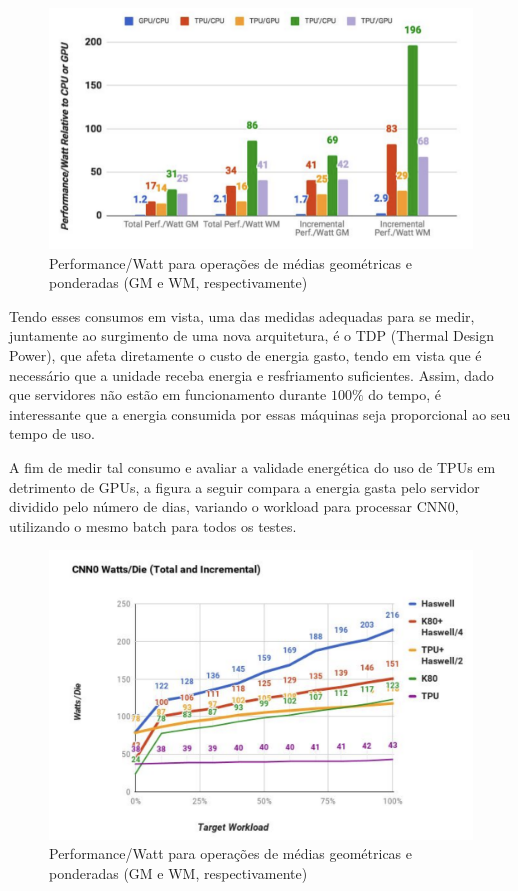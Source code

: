 \documentclass{report}
\begin{document}
\begin{figure}[h]
	\includegraphics[scale=0.5]{performance-watt}
	\centering
	\caption{Performance/Watt para operações de médias geométricas e ponderadas (GM e WM, respectivamente)}
\end{figure}

Tendo esses consumos em vista, uma das medidas adequadas para se medir, juntamente ao surgimento de uma nova arquitetura, é o TDP (Thermal Design Power), que afeta diretamente o custo de energia gasto, tendo em vista que é necessário que a unidade receba energia e resfriamento suficientes. Assim, dado que servidores não estão em funcionamento durante $100\%$ do tempo, é interessante que a energia consumida por essas máquinas seja proporcional ao seu tempo de uso.

A fim de medir tal consumo e avaliar a validade energética do uso de TPUs em detrimento de GPUs, a figura a seguir compara a energia gasta pelo servidor dividido pelo número de dias, variando o workload para processar CNN0, utilizando o mesmo batch para todos os testes.

\begin{figure}[h]
	\includegraphics[scale=0.5]{watts-die}
	\centering
	\caption{Performance/Watt para operações de médias geométricas e ponderadas (GM e WM, respectivamente)}
\end{figure}
\end{document}
